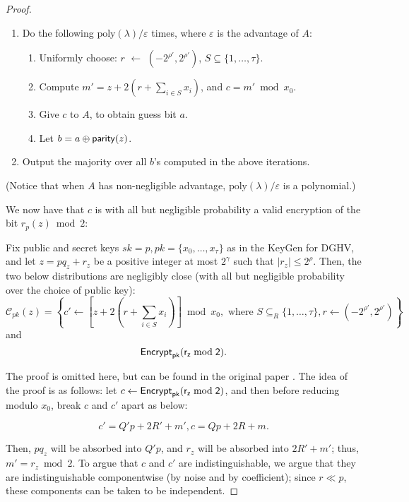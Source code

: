 \begin{proof}
\begin{enumerate}
\item Do the following $\text{poly}(\lambda) / \varepsilon$ times, where $\varepsilon$ is the advantage of $A$:
	\begin{enumerate}
	\item Uniformly choose: $r$ $\leftarrow$ $(-2^{\rho'}, 2^{\rho'})$, $S \subseteq \{1, \dots, \tau\}$. %
	\item Compute $m' = z + 2(r + \sum_{i \in S} x_i)$, and $c = m' \bmod x_0$.
	\item Give $c$ to $A$, to obtain guess bit $a$.
	\item Let $b = a \oplus {\sf parity}(z)$.
	\end{enumerate}
\item Output the majority over all $b$'s computed in the above iterations.
\end{enumerate}

(Notice that when $A$ has non-negligible advantage, $\text{poly}(\lambda) / \varepsilon$ is a polynomial.)

We now have that $c$ is with all but negligible probability a valid encryption of the bit $r_p(z) \bmod 2$:
\begin{lemma} \label{lem: validenc}
	Fix public and secret keys $sk = p, pk = \{x_0, \dots, x_\tau\}$ as in the KeyGen for DGHV, and let $z = pq_z + r_z$ be a positive integer at most $2^\gamma$ such that $|r_z| \leq 2^\rho$. Then, the two below distributions are negligibly close (with all but negligible probability over the choice of public key):
	 \[\mathcal{C}_{pk}(z) = \left\{ c' \leftarrow \left[z + 2(r + \sum_{i \in S} x_i) \right] \bmod x_0, \text{ where } S \subseteq_R \{1, \dots, \tau \}, r \leftarrow (-2^{\rho'}, 2^{\rho'}) \right\} \]
	 and
	 \[\sf{Encrypt}_{pk}(r_z \bmod 2). \]
\end{lemma}

The proof is omitted here, but can be found in the original paper \cite{dghv}. The idea of the proof is as follows: let $c \leftarrow \sf{Encrypt}_{pk}(r_z \bmod 2)$, and then before reducing modulo $x_0$, break $c$ and $c'$ apart as below:

\[ c' = Q'p + 2R' + m', c = Qp + 2R + m.\]

Then, $pq_z$ will be absorbed into $Q'p$, and $r_z$ will be absorbed into $2R' + m'$; thus, $m' = r_z \bmod 2$. To argue that $c$ and $c'$ are indistinguishable, we argue that they are indistinguishable componentwise (by noise and by coefficient); since $r \ll p$, these components can be taken to be independent.


\end{proof}
